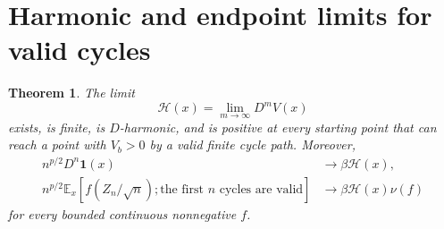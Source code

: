 \documentclass[11pt,letterpaper]{article}
\numberwithin{equation}{section}
\newtheorem{theorem}{Theorem}[section]
\theoremstyle{remark}\newtheorem{remark}[theorem]{Remark}
\newcommand{\EE}{\mathbb E}
\newcommand{\one}{\mathbf 1}
\begin{document}
\section{Harmonic and endpoint limits for valid cycles}\label{cps:amp:sec:validcycles}
\begin{theorem}\label{cps:amp:thm:cyclelimits}
The limit
\begin{equation}\label{cps:amp:eq:H}
 \mathcal H(x)=\lim_{m\to\infty}D^mV(x)
\end{equation}
exists, is finite, is $D$-harmonic, and is positive at every starting point that can reach a point with $V_b>0$ by a valid finite cycle path. Moreover,
\begin{align}
 n^{p/2}D^n\one(x)&\longrightarrow\beta\mathcal H(x),\label{cps:amp:eq:Dsurvival}\\
 n^{p/2}\EE_x[f(Z_n/\sqrt n);\text{the first }n\text{ cycles are valid}]
 &\longrightarrow\beta\mathcal H(x)\nu(f)\label{cps:amp:eq:DYaglom}
\end{align}
for every bounded continuous nonnegative $f$.
\end{theorem}
\end{document}
